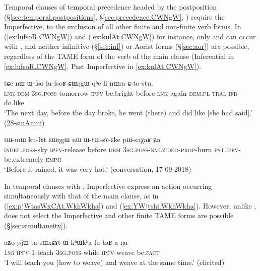 Temporal clauses of temporal precedence headed by the postposition  (§\ref{sec:temporal.postpositions}, §\ref{sec:precedence.CWNgW}, \citealt[286--287]{jacques14linking}) require the Imperfective, to the exclusion of all other finite and non-finite verb forms. In (\ref{ex:lufsoR.CWNgW}) and (\ref{ex:kulAt.CWNgW}) for instance, only  and  can occur with , and neither infinitive (§\ref{sec:inf}) or Aorist forms (§\ref{sec:aor}) are possible, regardless of the TAME form of the verb of the main clause (Inferential in \ref{ex:lufsoR.CWNgW}, Past Imperfective in \ref{ex:kulAt.CWNgW}).

\begin{exe}
\ex \label{ex:lufsoR.CWNgW}
\gll tɕe nɯ ɯ-fso lu-fsoʁ ɕɯŋgɯ qʰe li nɯra ɕ-to-stu. \\
\textsc{lnk} \textsc{dem} \textsc{3sg}.\textsc{poss}-tomorrow \textsc{ipfv}-be.bright before \textsc{lnk} again \textsc{dem}:\textsc{pl} \textsc{tral}-\textsc{ifr}-do.like \\
\glt `The next day, before the day broke, he went (there) and did like [she had said].' (28-smAnmi)
\end{exe}

\begin{exe}
\ex \label{ex:kulAt.CWNgW}
\gll tɯ-mɯ ku-lɤt ɕɯŋgɯ nɯ ɯ-tɯ-sɤ-ɕke pɯ-saχaʁ ʑo \\
\textsc{indef}.\textsc{poss}-sky \textsc{ipfv}-release before \textsc{dem} \textsc{3sg}.\textsc{poss}-\textsc{nmlz}:\textsc{deg}-\textsc{prop}-burn \textsc{pst}.\textsc{ipfv}-be.extremely \textsc{emph} \\
\glt `Before it rained, it was very hot.' (conversation, 17-09-2018)
\end{exe}

In temporal clauses with , Imperfective express an action occurring simultaneously with that of the main clause, as in (\ref{ex:pjWtasWxCAt.WkhWkha}) and (\ref{ex:YWjtshi.WkhWkha}). However, unlike ,  does not select the Imperfective and other finite TAME forms are possible (§\ref{sec:simultaneity}).

\begin{exe}
\ex \label{ex:pjWtasWxCAt.WkhWkha}
\gll aʑo pjɯ-ta-sɯxɕɤt ɯ-kʰɯkʰa lu-taʁ-a ŋu \\
\textsc{1sg} \textsc{ipfv}-1\fl{}-teach \textsc{3sg}.\textsc{poss}-while \textsc{ipfv}-weave be:\textsc{fact} \\
\glt `I will teach you (how to weave) and weave at the same time.' (elicited)
\end{exe}

